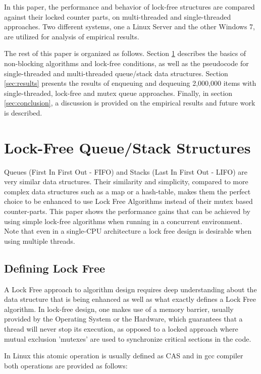\documentclass{article}
\begin{document}
In this paper, the performance and behavior of lock-free structures are compared against their locked counter parts, on multi-threaded and single-threaded approaches. Two different systems, one a Linux Server and the other Windows 7, are utilized for analysis of empirical results.

The rest of this paper is organized as follows. Section \ref{sec:lockfree} describes the basics of non-blocking algorithms and lock-free conditions, as well as the pseudocode for single-threaded and multi-threaded queue/stack data structures. Section \ref{sec:results} presents the results of enqueuing and dequeuing 2,000,000 items with single-threaded, lock-free and mutex queue approaches. Finally, in section \ref{sec:conclusion}, a discussion is provided on the empirical results and future work is described.

\section{Lock-Free Queue/Stack Structures}
\label{sec:lockfree}

Queues (First In First Out - FIFO) and Stacks (Last In First Out - LIFO) are very similar data structures. Their similarity and simplicity, compared to more complex data structures such as a map or a hash-table, makes them the perfect choice to be enhanced to use Lock Free Algorithms instead of their mutex based counter-parts. This paper shows the performance gains that can be achieved by using simple lock-free algorithms when running in a concurrent environment. Note that even in a single-CPU architecture a lock free design is desirable when using multiple threads.

\subsection{Defining Lock Free}

A Lock Free approach to algorithm design requires deep understanding about the data structure that is being enhanced as well as what exactly defines a Lock Free algorithm. In lock-free design, one makes use of a memory barrier, usually provided by the Operating System or the Hardware, which guarantees that a thread will never stop its execution, as opposed to a locked approach where mutual exclusion 'mutexes' are used to synchronize critical sections in the code.

In Linux this atomic operation is usually defined as CAS and in gcc compiler both operations are provided as follows:\
\end{document}
